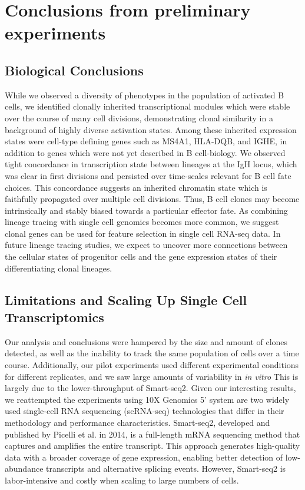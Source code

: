 \section{Conclusions from preliminary experiments}

\subsection{Biological Conclusions}
While we observed a diversity of phenotypes in the population of activated B cells, we identified clonally inherited transcriptional modules which were stable over the course of many cell divisions, demonstrating clonal similarity in a background of highly diverse activation states. Among these inherited expression states were cell-type defining genes such as MS4A1, HLA-DQB, and IGHE, in addition to genes which were not yet described in B cell-biology. We observed tight concordance in transcription state between lineages at the IgH locus, which was clear in first divisions and persisted over time-scales relevant for B cell fate choices\cite{hodgkin_modifying_2018}. This concordance suggests an inherited chromatin state which is faithfully propagated over multiple cell divisions. Thus, B cell clones may become intrinsically and stably biased towards a particular effector fate. As combining lineage tracing with single cell genomics becomes more common, we suggest clonal genes can be used for feature selection in single cell RNA-seq data. In future lineage tracing studies, we expect to uncover more connections between the cellular states of progenitor cells and the gene expression states of their differentiating clonal lineages.

\subsection{Limitations and Scaling Up Single Cell Transcriptomics}
Our analysis and conclusions were hampered by the size and amount of clones detected, as well as the inability to track the same population of cells over a time course. Additionally, our pilot experiments used different experimental conditions for different replicates, and we saw large amounts of variability in \textit{in vitro} This is largely due to the lower-throughput of Smart-seq2\cite{baran2018experimental}. Given our interesting results, we reattempted the experiments using   10X Genomics 5' system are two widely used single-cell RNA sequencing (scRNA-seq) technologies that differ in their methodology and performance characteristics. Smart-seq2, developed and published by Picelli et al. in 2014\cite{picelli2014full}, is a full-length mRNA sequencing method that captures and amplifies the entire transcript. This approach generates high-quality data with a broader coverage of gene expression, enabling better detection of low-abundance transcripts and alternative splicing events. However, Smart-seq2 is labor-intensive and costly when scaling to large numbers of cells.

